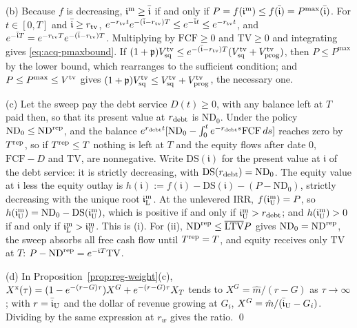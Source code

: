 (b) Because $f$ is decreasing, $\mathfrak i^{\rm m}\ge\bar{\mathfrak i}$ if and only if $P=f(\mathfrak i^{\rm m})\le f(\bar{\mathfrak i})=P^{\max}(\bar{\mathfrak i})$. For $t\in[0,T]$ and $\bar{\mathfrak i}\ge r_{\rm tv}$, $e^{-r_{\rm tv}t}e^{-(\bar{\mathfrak i}-r_{\rm tv})T}\le e^{-\bar{\mathfrak i}t}\le e^{-r_{\rm tv}t}$, and $e^{-\bar{\mathfrak i}T}=e^{-r_{\rm tv}T}e^{-(\bar{\mathfrak i}-r_{\rm tv})T}$. Multiplying by $\mathrm{FCF}\ge0$ and $\mathrm{TV}\ge0$ and integrating gives \eqref{eq:acq-pmaxbound}. If $(1+\mathfrak p)V^{\rm tv}_{\rm sq}\le e^{-(\bar{\mathfrak i}-r_{\rm tv})T}(V^{\rm tv}_{\rm sq}+V^{\rm tv}_{\rm prog})$, then $P\le P^{\max}$ by the lower bound, which rearranges to the sufficient condition; and $P\le P^{\max}\le V^{\rm tv}$ gives $(1+\mathfrak p)V^{\rm tv}_{\rm sq}\le V^{\rm tv}_{\rm sq}+V^{\rm tv}_{\rm prog}$, the necessary one.

(c) Let the sweep pay the debt service $D(t)\ge0$, with any balance left at $T$ paid then, so that its present value at $r_{\rm debt}$ is $\mathrm{ND}_0$. Under the policy $\mathrm{ND}_0\le\mathrm{ND}^{\rm rep}$, and the balance $e^{r_{\rm debt}t}[\mathrm{ND}_0-\int_0^te^{-r_{\rm debt}s}\mathrm{FCF}\,ds]$ reaches zero by $T^{\rm rep}$, so if $T^{\rm rep}\le T$ nothing is left at $T$ and the equity flows after date 0, $\mathrm{FCF}-D$ and $\mathrm{TV}$, are nonnegative. Write $\mathrm{DS}(\mathfrak i)$ for the present value at $\mathfrak i$ of the debt service: it is strictly decreasing, with $\mathrm{DS}(r_{\rm debt})=\mathrm{ND}_0$. The equity value at $\mathfrak i$ less the equity outlay is $h(\mathfrak i):=f(\mathfrak i)-\mathrm{DS}(\mathfrak i)-(P-\mathrm{ND}_0)$, strictly decreasing with the unique root $\mathfrak i^{\rm m}_{\rm L}$. At the unlevered IRR, $f(\mathfrak i^{\rm m}_{\rm U})=P$, so $h(\mathfrak i^{\rm m}_{\rm U})=\mathrm{ND}_0-\mathrm{DS}(\mathfrak i^{\rm m}_{\rm U})$, which is positive if and only if $\mathfrak i^{\rm m}_{\rm U}>r_{\rm debt}$; and $h(\mathfrak i^{\rm m}_{\rm U})>0$ if and only if $\mathfrak i^{\rm m}_{\rm L}>\mathfrak i^{\rm m}_{\rm U}$. This is (i). For (ii), $\mathrm{ND}^{\rm rep}\le\overline{\mathrm{LTV}}P$ gives $\mathrm{ND}_0=\mathrm{ND}^{\rm rep}$, the sweep absorbs all free cash flow until $T^{\rm rep}=T$, and equity receives only $\mathrm{TV}$ at $T$: $P-\mathrm{ND}^{\rm rep}=e^{-\mathfrak iT}\mathrm{TV}$.

(d) In Proposition~\ref{prop:reg-weight}(c), $X^{\rm x}(\tau)=(1-e^{-(r-G)\tau})X^G+e^{-(r-G)\tau}X_T$ tends to $X^G=\hat m/(r-G)$ as $\tau\to\infty$; with $r=\bar{\mathfrak i}_{\rm U}$ and the dollar of revenue growing at $G_i$, $X^G=\hat m/(\bar{\mathfrak i}_{\rm U}-G_i)$. Dividing by the same expression at $r_w$ gives the ratio. \qed

